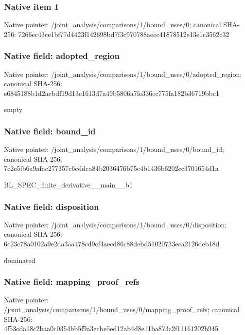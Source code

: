 \documentclass[10pt,a4paper]{article}
\begin{document}
\subsubsection{Native item 1}
Native pointer: /joint\_\allowbreak{}analysis/comparisons/1/bound\_\allowbreak{}uses/0; canonical SHA-256: 7266ec43ce1bf77d4423f142698bd7f3c970788aeec41878512e13e1c3562c32

\subsubsection{Native field: adopted\_\allowbreak{}region}
Native pointer: /joint\_\allowbreak{}analysis/comparisons/1/bound\_\allowbreak{}uses/0/adopted\_\allowbreak{}region; canonical SHA-256: e6845188b1d2aebdf19d13c1613d7a49b5806a7fe336ec775fa182b36719bbc1

\begingroup\raggedright\sloppy empty\par\endgroup

\subsubsection{Native field: bound\_\allowbreak{}id}
Native pointer: /joint\_\allowbreak{}analysis/comparisons/1/bound\_\allowbreak{}uses/0/bound\_\allowbreak{}id; canonical SHA-256: 7c2e5fb6a9afac277357c6cddca84b2036476b75c4b1436b6202cc3701654d1a

\begingroup\raggedright\sloppy BL\_\allowbreak{}SPEC\_\allowbreak{}finite\_\allowbreak{}derivative\_\allowbreak{}\_\allowbreak{}main\_\allowbreak{}\_\allowbreak{}b1\par\endgroup

\subsubsection{Native field: disposition}
Native pointer: /joint\_\allowbreak{}analysis/comparisons/1/bound\_\allowbreak{}uses/0/disposition; canonical SHA-256: 6c23c78a0102a9e2da3aa478cd9cf4aecd86c88debd51020733eca2126deb18d

\begingroup\raggedright\sloppy dominated\par\endgroup

\subsubsection{Native field: mapping\_\allowbreak{}proof\_\allowbreak{}refs}
Native pointer: /joint\_\allowbreak{}analysis/comparisons/1/bound\_\allowbreak{}uses/0/mapping\_\allowbreak{}proof\_\allowbreak{}refs; canonical SHA-256: 4f53cda18c2baa0c0354bb5f9a3ecbe5ed12ab4d8e11ba873c2f11161202b945
\end{document}
